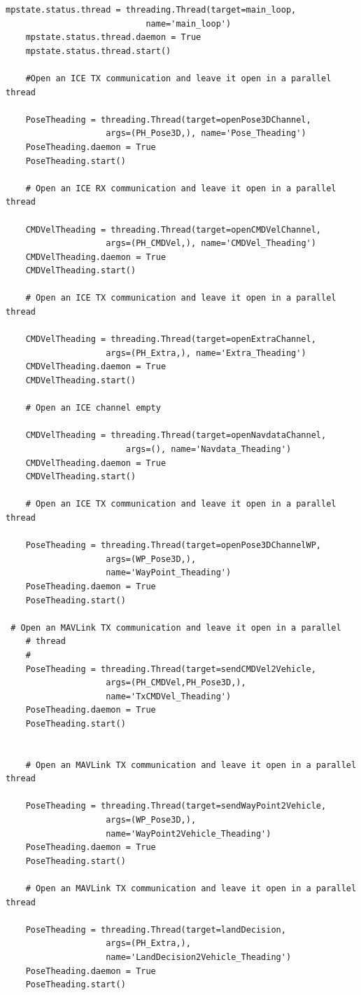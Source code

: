 \begin{lstlisting}[frame=single]
	mpstate.status.thread = threading.Thread(target=main_loop, 
    						name='main_loop')
    mpstate.status.thread.daemon = True
    mpstate.status.thread.start()

    #Open an ICE TX communication and leave it open in a parallel thread

    PoseTheading = threading.Thread(target=openPose3DChannel, 
    				args=(PH_Pose3D,), name='Pose_Theading')
    PoseTheading.daemon = True
    PoseTheading.start()

    # Open an ICE RX communication and leave it open in a parallel thread

    CMDVelTheading = threading.Thread(target=openCMDVelChannel, 
    				args=(PH_CMDVel,), name='CMDVel_Theading')
    CMDVelTheading.daemon = True
    CMDVelTheading.start()

    # Open an ICE TX communication and leave it open in a parallel thread

    CMDVelTheading = threading.Thread(target=openExtraChannel, 
    				args=(PH_Extra,), name='Extra_Theading')
    CMDVelTheading.daemon = True
    CMDVelTheading.start()

    # Open an ICE channel empty

    CMDVelTheading = threading.Thread(target=openNavdataChannel, 
    					args=(), name='Navdata_Theading')
    CMDVelTheading.daemon = True
    CMDVelTheading.start()

    # Open an ICE TX communication and leave it open in a parallel thread

    PoseTheading = threading.Thread(target=openPose3DChannelWP, 
    				args=(WP_Pose3D,), 
                    name='WayPoint_Theading')
    PoseTheading.daemon = True
    PoseTheading.start()

 # Open an MAVLink TX communication and leave it open in a parallel 
    # thread
    #
    PoseTheading = threading.Thread(target=sendCMDVel2Vehicle, 
    				args=(PH_CMDVel,PH_Pose3D,), 
                    name='TxCMDVel_Theading')
    PoseTheading.daemon = True
    PoseTheading.start()


    # Open an MAVLink TX communication and leave it open in a parallel thread

    PoseTheading = threading.Thread(target=sendWayPoint2Vehicle,
    				args=(WP_Pose3D,), 
                    name='WayPoint2Vehicle_Theading')
    PoseTheading.daemon = True
    PoseTheading.start()

    # Open an MAVLink TX communication and leave it open in a parallel thread

    PoseTheading = threading.Thread(target=landDecision, 
    				args=(PH_Extra,), 
                    name='LandDecision2Vehicle_Theading')
    PoseTheading.daemon = True
    PoseTheading.start()
   
\end{lstlisting}

